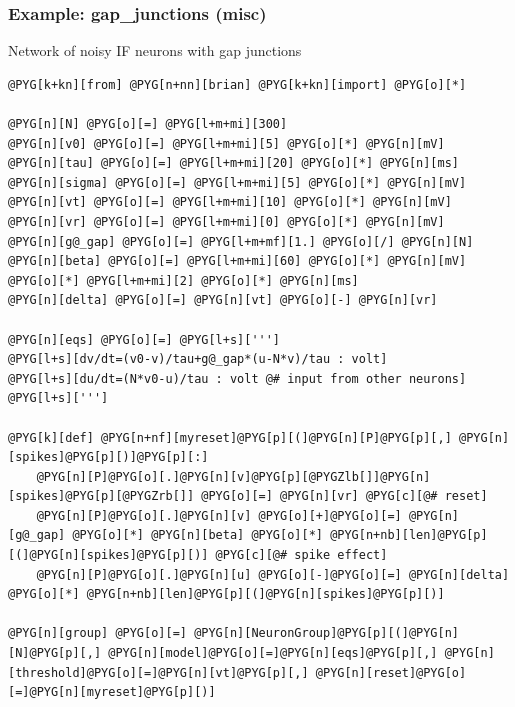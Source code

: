 \documentclass[letterpaper,10pt,english]{manual}
\begin{document}
\resetcurrentobjects
\hypertarget{--doc-examples-misc_gap_junctions}{}

\hypertarget{index-48}{}\subsubsection{Example: gap\_junctions (misc)}

Network of noisy IF neurons with gap junctions

\begin{Verbatim}[commandchars=@\[\]]
@PYG[k+kn][from] @PYG[n+nn][brian] @PYG[k+kn][import] @PYG[o][*]

@PYG[n][N] @PYG[o][=] @PYG[l+m+mi][300]
@PYG[n][v0] @PYG[o][=] @PYG[l+m+mi][5] @PYG[o][*] @PYG[n][mV]
@PYG[n][tau] @PYG[o][=] @PYG[l+m+mi][20] @PYG[o][*] @PYG[n][ms]
@PYG[n][sigma] @PYG[o][=] @PYG[l+m+mi][5] @PYG[o][*] @PYG[n][mV]
@PYG[n][vt] @PYG[o][=] @PYG[l+m+mi][10] @PYG[o][*] @PYG[n][mV]
@PYG[n][vr] @PYG[o][=] @PYG[l+m+mi][0] @PYG[o][*] @PYG[n][mV]
@PYG[n][g@_gap] @PYG[o][=] @PYG[l+m+mf][1.] @PYG[o][/] @PYG[n][N]
@PYG[n][beta] @PYG[o][=] @PYG[l+m+mi][60] @PYG[o][*] @PYG[n][mV] @PYG[o][*] @PYG[l+m+mi][2] @PYG[o][*] @PYG[n][ms]
@PYG[n][delta] @PYG[o][=] @PYG[n][vt] @PYG[o][-] @PYG[n][vr]

@PYG[n][eqs] @PYG[o][=] @PYG[l+s][''']
@PYG[l+s][dv/dt=(v0-v)/tau+g@_gap*(u-N*v)/tau : volt]
@PYG[l+s][du/dt=(N*v0-u)/tau : volt @# input from other neurons]
@PYG[l+s][''']

@PYG[k][def] @PYG[n+nf][myreset]@PYG[p][(]@PYG[n][P]@PYG[p][,] @PYG[n][spikes]@PYG[p][)]@PYG[p][:]
    @PYG[n][P]@PYG[o][.]@PYG[n][v]@PYG[p][@PYGZlb[]]@PYG[n][spikes]@PYG[p][@PYGZrb[]] @PYG[o][=] @PYG[n][vr] @PYG[c][@# reset]
    @PYG[n][P]@PYG[o][.]@PYG[n][v] @PYG[o][+]@PYG[o][=] @PYG[n][g@_gap] @PYG[o][*] @PYG[n][beta] @PYG[o][*] @PYG[n+nb][len]@PYG[p][(]@PYG[n][spikes]@PYG[p][)] @PYG[c][@# spike effect]
    @PYG[n][P]@PYG[o][.]@PYG[n][u] @PYG[o][-]@PYG[o][=] @PYG[n][delta] @PYG[o][*] @PYG[n+nb][len]@PYG[p][(]@PYG[n][spikes]@PYG[p][)]

@PYG[n][group] @PYG[o][=] @PYG[n][NeuronGroup]@PYG[p][(]@PYG[n][N]@PYG[p][,] @PYG[n][model]@PYG[o][=]@PYG[n][eqs]@PYG[p][,] @PYG[n][threshold]@PYG[o][=]@PYG[n][vt]@PYG[p][,] @PYG[n][reset]@PYG[o][=]@PYG[n][myreset]@PYG[p][)]


\end{Verbatim}
\end{document}
